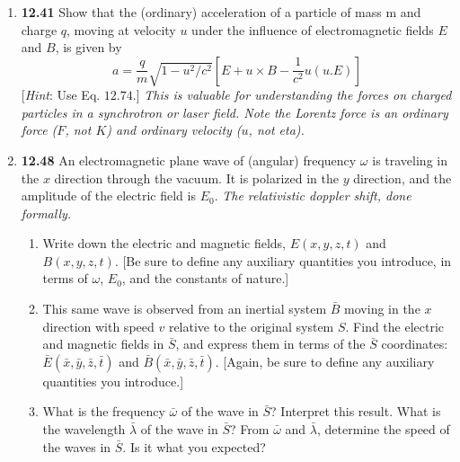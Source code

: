 \documentclass[fleqn]{article}
\begin{document}
  \begin{enumerate}
    \item \textbf{12.41} Show that the (ordinary) acceleration of a particle of mass m and
    charge $q$, moving at velocity $u$ under the influence of electromagnetic fields $E$ and
    $B$, is given by
    $$
      a=\dfrac{q}{m} \sqrt{1-u^2/c^2} \left[E+u \times B-\dfrac{1}{c^2} u (u.E)\right]
    $$
    [\emph{Hint}: Use Eq. $12.74$.]
    \emph{This is valuable for understanding the forces on charged particles in a synchrotron 
    or laser field. Note the Lorentz force is an ordinary force ($F$, not $K$) and ordinary velocity ($u$, not eta).}


    \item \textbf{12.48} An electromagnetic plane wave of (angular) frequency $\omega$ is traveling
    in the $x$ direction through the vacuum. It is polarized in the $y$ direction, and the
    amplitude of the electric field is $E_0$.
    \emph{The relativistic doppler shift, done formally.}
    \begin{enumerate}
      \item Write down the electric and magnetic fields, $E(x, y,z, t)$ and $B(x, y,z, t)$. [Be
      sure to define any auxiliary quantities you introduce, in terms of $\omega$, $E_0$, and the
      constants of nature.]


      \item This same wave is observed from an inertial system $\bar{B}$ moving in the $x$ direction
      with speed $v$ relative to the original system $S$. Find the electric and magnetic
      fields in $\bar{S}$, and express them in terms of the $\bar{S}$ coordinates:  $\bar{E}(\bar{x}, \bar{y}, \bar{z}, \bar{t})$ and
      $\bar{B}(\bar{x}, \bar{y}, \bar{z}, \bar{t})$. [Again, be sure to define any auxiliary quantities you introduce.]


      \item  What is the frequency $\bar{\omega}$ of the wave in $\bar{S}$? Interpret this result. What is the
      wavelength $\bar{\lambda}$ of the wave in $\bar{S}$? From $\bar{\omega}$ and $\bar{\lambda}$, determine the speed of the
      waves in $\bar{S}$. Is it what you expected?


\end{enumerate}
\end{enumerate}
\end{document}
